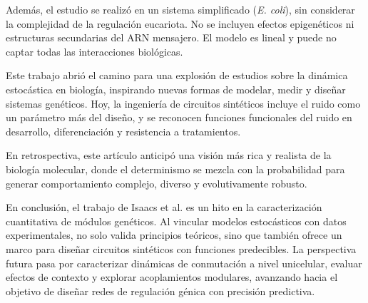 \documentclass[nochap]{config/ejercicios}
\begin{document}
Además, el estudio se realizó en un sistema simplificado (\textit{E. coli}), sin considerar la complejidad de la regulación eucariota. No se incluyen efectos epigenéticos ni estructuras secundarias del ARN mensajero. El modelo es lineal y puede no captar todas las interacciones biológicas.


Este trabajo abrió el camino para una explosión de estudios sobre la dinámica estocástica en biología, inspirando nuevas formas de modelar, medir y diseñar sistemas genéticos. Hoy, la ingeniería de circuitos sintéticos incluye el ruido como un parámetro más del diseño, y se reconocen funciones funcionales del ruido en desarrollo, diferenciación y resistencia a tratamientos.

En retrospectiva, este artículo anticipó una visión más rica y realista de la biología molecular, donde el determinismo se mezcla con la probabilidad para generar comportamiento complejo, diverso y evolutivamente robusto.


En conclusión, el trabajo de Isaacs et al. es un hito en la caracterización cuantitativa de módulos genéticos. Al vincular modelos estocásticos con datos experimentales, no solo valida principios teóricos, sino que también ofrece un marco para diseñar circuitos sintéticos con funciones predecibles. La perspectiva futura pasa por caracterizar dinámicas de conmutación a nivel unicelular, evaluar efectos de contexto y explorar acoplamientos modulares, avanzando hacia el objetivo de diseñar redes de regulación génica con precisión predictiva.
\end{document}
